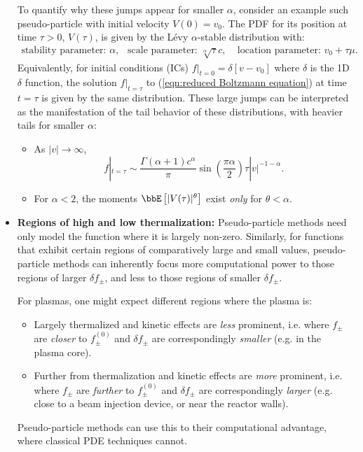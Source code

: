 \begin{itemize}
        To quantify why these jumps appear for smaller $\alpha$, consider an example such pseudo-particle with initial velocity $V(0)  =  v_{0}$. The PDF for its position at time $\tau  >  0$, $V(\tau)$, is given by the Lévy $\alpha$-stable distribution \cite{Lévy_1925, Mandelbrot_1960} with:
        \begin{align*}
            \text{stability parameter: } \alpha,            &&
            \text{scale parameter: } \sqrt[\alpha]{\tau}c,  &&
            \text{location parameter: } v_{0} + \tau\mu.
        \end{align*}
        Equivalently, for initial conditions (ICs) $f|_{t = 0}  =  \delta[v - v_{0}]$ where $\delta$ is the 1D $\delta$ function, the solution $f|_{t = \tau}$ to (\ref{eqn:reduced Boltzmann equation}) at time $t = \tau$ is given by the same distribution. These large jumps can be interpreted as the manifestation of the tail behavior of these distributions, with heavier tails for smaller $\alpha$:
        \begin{itemize}
            \item  As $|v|  \rightarrow  \infty$, \cite{Nolan_2020}
            \begin{equation}
                f|_{t = \tau}  \sim  \frac{\Gamma(\alpha + 1)c^{\alpha}}{\pi}\sin\left(\frac{\pi\alpha}{2}\right)\tau|v|^{- 1 - \alpha}.
            \end{equation}
            \item  For $\alpha  <  2$, the moments $\bbE\left[|V(\tau)|^{\theta}\right]$ exist \emph{only} for $\theta  <  \alpha$.
        \end{itemize}
        
        \item  {\bf Regions of high and low thermalization:} Pseudo-particle methods need only model the function where it is largely non-zero. Similarly, for functions that exhibit certain regions of comparatively large and small values, pseudo-particle methods can inherently focus more computational power to those regions of larger $\delta\!f_{\pm}$, and less to those regions of smaller $\delta\!f_{\pm}$.
        
        For plasmas, one might expect different regions where the plasma is:
        \begin{itemize}
            \item  Largely thermalized and kinetic effects are \emph{less} prominent, i.e. where $f_{\pm}$ are \emph{closer} to $f_{\pm}^{(0)}$ and $\delta\!f_{\pm}$ are correspondingly \emph{smaller} (e.g. in the plasma core).
            \item  Further from thermalization and kinetic effects are \emph{more} prominent, i.e. where $f_{\pm}$ are \emph{further} to $f_{\pm}^{(0)}$ and $\delta\!f_{\pm}$ are correspondingly \emph{larger} (e.g. close to a beam injection device, or near the reactor walls).
        \end{itemize}
        Pseudo-particle methods can use this to their computational advantage, where classical PDE techniques cannot.
    \end{itemize}
    